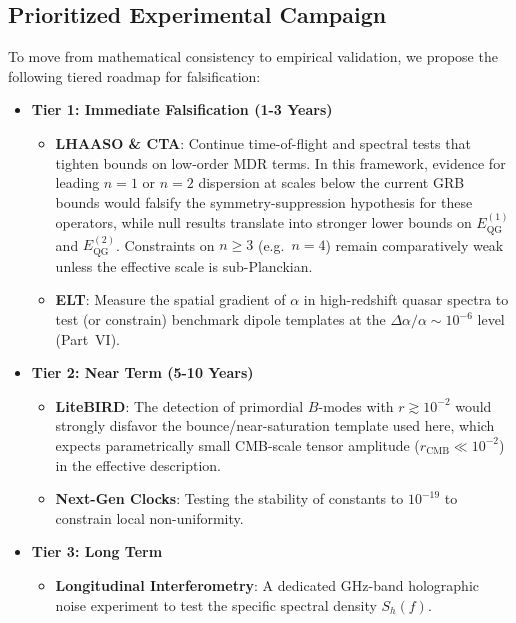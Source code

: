 \subsection{Prioritized Experimental Campaign}
To move from mathematical consistency to empirical validation, we propose the following tiered roadmap for falsification:

\begin{itemize}
    \item \textbf{Tier 1: Immediate Falsification (1-3 Years)}
    \begin{itemize}
        \item \textbf{LHAASO \& CTA}: Continue time-of-flight and spectral tests that tighten bounds on low-order MDR terms. In this framework, evidence for leading $n=1$ or $n=2$ dispersion at scales below the current GRB bounds would falsify the symmetry-suppression hypothesis for these operators, while null results translate into stronger lower bounds on $E^{(1)}_{\mathrm{QG}}$ and $E^{(2)}_{\mathrm{QG}}$. Constraints on $n\ge 3$ (e.g.\ $n=4$) remain comparatively weak unless the effective scale is sub-Planckian.
        \item \textbf{ELT}: Measure the spatial gradient of $\alpha$ in high-redshift quasar spectra to test (or constrain) benchmark dipole templates at the $\Delta \alpha/\alpha \sim 10^{-6}$ level (Part~VI).
    \end{itemize}
    
    \item \textbf{Tier 2: Near Term (5-10 Years)}
    \begin{itemize}
        \item \textbf{LiteBIRD}: The detection of primordial $B$-modes with $r \gtrsim 10^{-2}$ would strongly disfavor the bounce/near-saturation template used here, which expects parametrically small CMB-scale tensor amplitude ($r_{\mathrm{CMB}}\ll 10^{-2}$) in the effective description.
        \item \textbf{Next-Gen Clocks}: Testing the stability of constants to $10^{-19}$ to constrain local non-uniformity.
    \end{itemize}
    
    \item \textbf{Tier 3: Long Term}
    \begin{itemize}
        \item \textbf{Longitudinal Interferometry}: A dedicated GHz-band holographic noise experiment to test the specific spectral density $S_h(f)$.
    \end{itemize}
\end{itemize}




